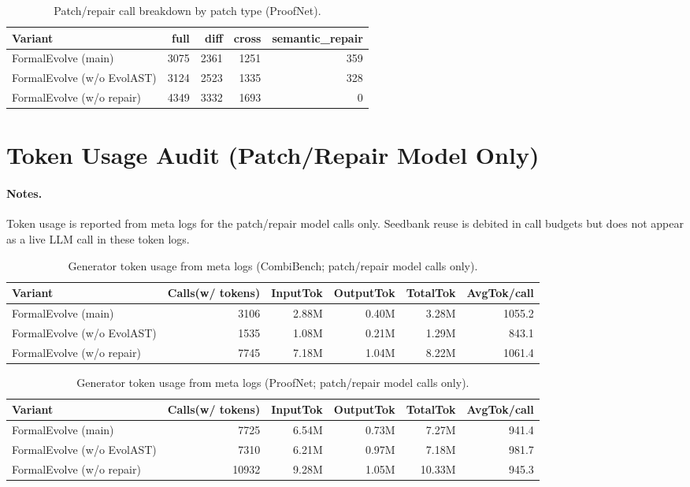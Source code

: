 \documentclass[10pt]{article}
\begin{document}
\begin{table}[h]
  \centering
  \caption{Patch/repair call breakdown by patch type (ProofNet).}
  \label{tab:supp-patch-breakdown-pn}
  \scriptsize
  \begin{tabular}{lrrrr}
    \toprule
    Variant & full & diff & cross & semantic\_repair \\
    \midrule
    FormalEvolve (main) & 3075 & 2361 & 1251 & 359 \\
    FormalEvolve (w/o EvolAST) & 3124 & 2523 & 1335 & 328 \\
    FormalEvolve (w/o repair) & 4349 & 3332 & 1693 & 0 \\
    \bottomrule
  \end{tabular}
\end{table}

\section{Token Usage Audit (Patch/Repair Model Only)}

\paragraph{Notes.}
Token usage is reported from meta logs for the patch/repair model calls only. Seedbank reuse is debited in call budgets but does not appear as a live LLM call in these token logs.

\begin{table}[h]
  \centering
  \caption{Generator token usage from meta logs (CombiBench; patch/repair model calls only).}
  \label{tab:supp-token-cb}
  \scriptsize
  \begin{tabular}{lrrrrr}
    \toprule
    Variant & Calls(w/ tokens) & InputTok & OutputTok & TotalTok & AvgTok/call \\
    \midrule
    FormalEvolve (main) & 3106 & 2.88M & 0.40M & 3.28M & 1055.2 \\
    FormalEvolve (w/o EvolAST) & 1535 & 1.08M & 0.21M & 1.29M & 843.1 \\
    FormalEvolve (w/o repair) & 7745 & 7.18M & 1.04M & 8.22M & 1061.4 \\
    \bottomrule
  \end{tabular}
\end{table}

\begin{table}[h]
  \centering
  \caption{Generator token usage from meta logs (ProofNet; patch/repair model calls only).}
  \label{tab:supp-token-pn}
  \scriptsize
  \begin{tabular}{lrrrrr}
    \toprule
    Variant & Calls(w/ tokens) & InputTok & OutputTok & TotalTok & AvgTok/call \\
    \midrule
    FormalEvolve (main) & 7725 & 6.54M & 0.73M & 7.27M & 941.4 \\
    FormalEvolve (w/o EvolAST) & 7310 & 6.21M & 0.97M & 7.18M & 981.7 \\
    FormalEvolve (w/o repair) & 10932 & 9.28M & 1.05M & 10.33M & 945.3 \\
    \bottomrule
  \end{tabular}
\end{table}
\end{document}
